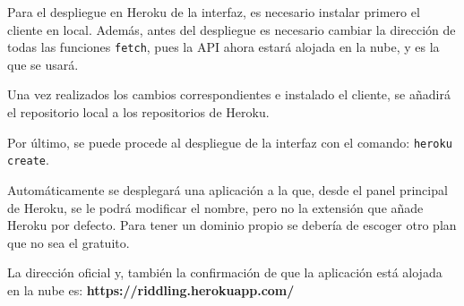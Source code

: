 Para el despliegue en Heroku de la interfaz, es necesario instalar primero el cliente en local\cite{heroku}. Además, antes del despliegue es necesario cambiar la dirección de todas las funciones \texttt{fetch}, pues la API ahora estará alojada en la nube, y es la que se usará.

Una vez realizados los cambios correspondientes e instalado el cliente, se añadirá el repositorio local a los repositorios de Heroku\cite{heroku2}. 

Por último, se puede procede al despliegue de la interfaz con el comando: \texttt{heroku create}.

Automáticamente se desplegará una aplicación a la que, desde el panel principal de Heroku, se le podrá modificar el nombre, pero no la extensión que añade Heroku por defecto. Para tener un dominio propio se debería de escoger otro plan que no sea el gratuito.

La dirección oficial y, también la confirmación de que la aplicación está alojada en la nube es: \textbf{https://riddling.herokuapp.com/}